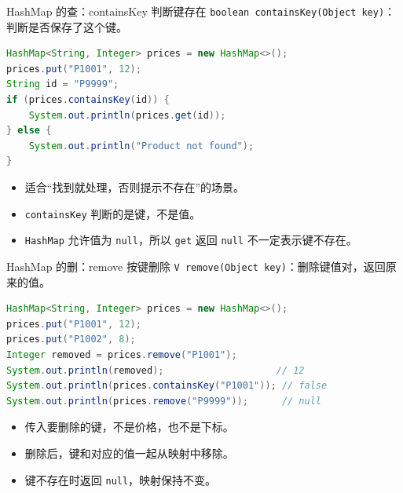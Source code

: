 \documentclass[aspectratio=169]{beamer}
\begin{document}
\begin{frame}[fragile]{HashMap 的查：containsKey 判断键存在}
  \texttt{boolean containsKey(Object key)}：判断是否保存了这个键。
  \begin{lstlisting}[language=Java]
HashMap<String, Integer> prices = new HashMap<>();
prices.put("P1001", 12);
String id = "P9999";
if (prices.containsKey(id)) {
    System.out.println(prices.get(id));
} else {
    System.out.println("Product not found");
}
  \end{lstlisting}
  \begin{itemize}
    \item 适合“找到就处理，否则提示不存在”的场景。
    \item \texttt{containsKey} 判断的是键，不是值。
    \item \texttt{HashMap} 允许值为 \texttt{null}，所以 \texttt{get} 返回 \texttt{null} 不一定表示键不存在。
  \end{itemize}
\end{frame}


\begin{frame}[fragile]{HashMap 的删：remove 按键删除}
  \texttt{V remove(Object key)}：删除键值对，返回原来的值。
  \begin{lstlisting}[language=Java]
HashMap<String, Integer> prices = new HashMap<>();
prices.put("P1001", 12);
prices.put("P1002", 8);
Integer removed = prices.remove("P1001");
System.out.println(removed);                    // 12
System.out.println(prices.containsKey("P1001")); // false
System.out.println(prices.remove("P9999"));      // null
  \end{lstlisting}
  \begin{itemize}
    \item 传入要删除的\alert{键}，不是价格，也不是下标。
    \item 删除后，键和对应的值一起从映射中移除。
    \item 键不存在时返回 \texttt{null}，映射保持不变。
  \end{itemize}
\end{frame}
\end{document}
